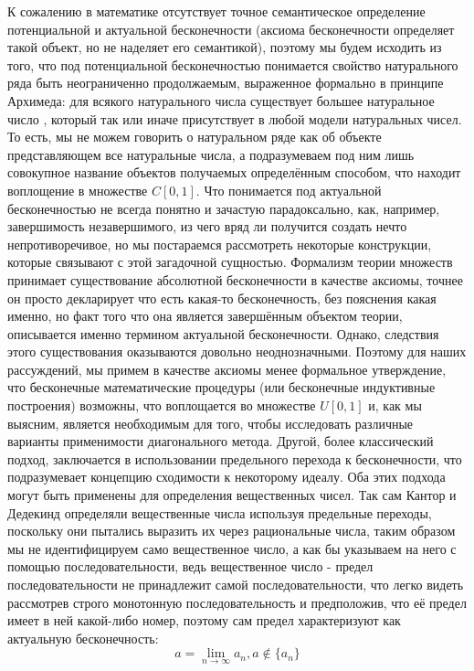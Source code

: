 \documentclass[12pt]{article}
\begin{document}
К сожалению в математике отсутствует точное семантическое определение потенциальной и актуальной бесконечности (аксиома бесконечности определяет такой объект, но не наделяет его семантикой), поэтому мы будем исходить из того, что под потенциальной бесконечностью понимается свойство натурального ряда быть неограниченно продолжаемым, выраженное формально в принципе Архимеда: для всякого натурального числа существует большее натуральное число \cite{matan-archimed}, который так или иначе присутствует в любой модели натуральных чисел. То есть, мы не можем говорить о натуральном ряде как об объекте представляющем все натуральные числа, а подразумеваем под ним лишь совокупное название объектов получаемых определённым способом, что находит воплощение в множестве $C[0, 1]$. Что понимается под актуальной бесконечностью не всегда понятно и зачастую парадоксально, как, например, завершимость незавершимого, из чего вряд ли получится создать нечто непротиворечивое, но мы постараемся рассмотреть некоторые конструкции, которые связывают с этой загадочной сущностью. Формализм теории множеств принимает существование абсолютной бесконечности в качестве аксиомы, точнее он просто декларирует что есть какая-то бесконечность, без пояснения какая именно, но факт того что она является завершённым объектом теории, описывается именно термином актуальной бесконечности. Однако, следствия этого существования оказываются довольно неоднозначными. Поэтому для наших рассуждений, мы примем в качестве аксиомы менее формальное утверждение, что бесконечные математические процедуры (или бесконечные индуктивные построения) возможны, что воплощается во множестве $U[0, 1]$ и, как мы выясним, является необходимым для того, чтобы исследовать различные варианты применимости диагонального метода. Другой, более классический подход, заключается в использовании предельного перехода к бесконечности, что подразумевает концепцию сходимости к некоторому идеалу. Оба этих подхода могут быть применены для определения вещественных чисел. Так сам Кантор \cite{settheory} и Дедекинд \cite{irrationality} определяли вещественные числа используя предельные переходы, поскольку они пытались выразить их через рациональные числа, таким образом мы не идентифицируем само вещественное число, а как бы указываем на него с помощью последовательности, ведь вещественное число - предел последовательности не принадлежит самой последовательности, что легко видеть рассмотрев строго монотонную последовательность и предположив, что её предел имеет в ней какой-либо номер, поэтому сам предел характеризуют как актуальную бесконечность:
\begin{equation}
a = \lim_{n\to\infty} a_n, a \notin \{a_n\}
\end{equation}
\end{document}

